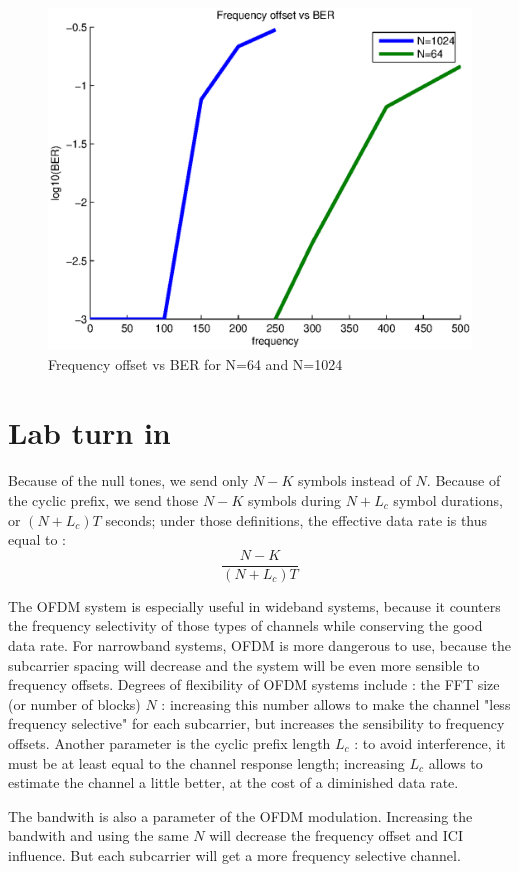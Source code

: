 \documentclass{article}
\begin{document}
   \begin{figure}[h!]
        \centering
        \includegraphics[width = 0.5 \textwidth]{fber.eps}
        \caption{Frequency offset vs BER for N=64 and N=1024}
        \label{fber}
    \end{figure}
        
        
\section{Lab turn in}
Because of the null tones, we send only $N-K$ symbols instead of $N$. Because of the cyclic prefix, we send those $N-K$ symbols during $N+L_c$ symbol durations, or $(N+L_c)T$ seconds; under those definitions, the effective data rate is thus equal to :
\begin{equation}
\frac{N-K}{(N+L_c)T}
\end{equation}
 
The OFDM system is especially useful in wideband systems, because it counters the frequency selectivity of those types of channels while conserving the good data rate. For narrowband systems, OFDM is more dangerous to use, because the subcarrier spacing will decrease and the system will be even more sensible to frequency offsets. Degrees of flexibility of OFDM systems include : the FFT size (or number of blocks) $N$ : increasing this number allows to make the channel "less frequency selective" for each subcarrier, but increases the sensibility to frequency offsets. Another parameter is the cyclic prefix length $L_c$ : to avoid interference, it must be at least equal to the channel response length; increasing $L_c$ allows to estimate the channel a little better, at the cost of a diminished data rate.

The bandwith is also a parameter of the OFDM modulation. Increasing the bandwith and using the same $N$ will decrease the frequency offset and ICI influence. But each subcarrier will get a more frequency selective channel.

    
\end{document}
